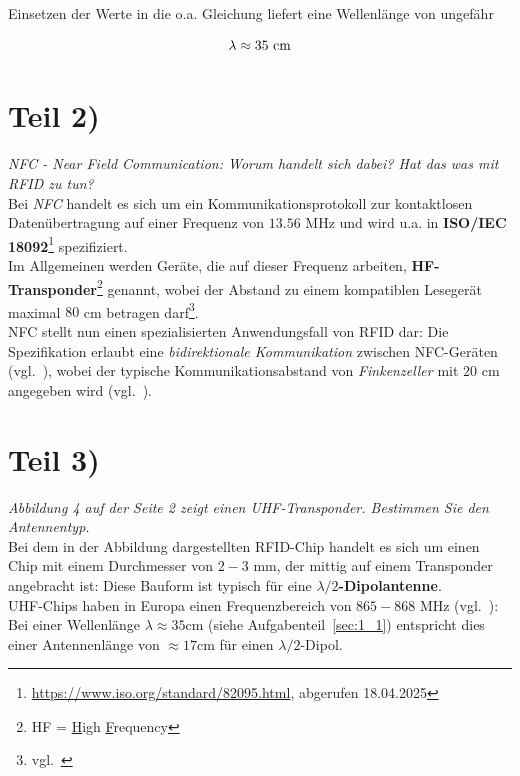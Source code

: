 \noindent
Einsetzen der Werte in die o.a. Gleichung liefert eine Wellenlänge von ungefähr

\begin{equation}\notag
\lambda \approx 35\ \text{cm}
\end{equation}


\section{Teil 2)}

\textit{NFC - Near Field Communication: Worum handelt sich dabei? Hat das was mit RFID zu tun?}\\


\noindent
Bei \textit{NFC} handelt es sich um ein Kommunikationsprotokoll zur kontaktlosen Datenübertragung auf einer Frequenz von $13.56$ MHz und wird u.a. in \textbf{ISO/IEC 18092}\footnote{
    \url{https://www.iso.org/standard/82095.html}, abgerufen 18.04.2025
} spezifiziert.\\

\noindent
Im Allgemeinen werden Geräte, die auf dieser Frequenz arbeiten, \textbf{HF-Transponder}\footnote{HF = \underline{H}igh \underline{F}requency} genannt, wobei der Abstand zu einem kompatiblen Lesegerät maximal $80$ cm betragen darf\footnote{vgl.~\cite[137]{ES5}}.\\

\noindent
NFC stellt nun einen spezialisierten Anwendungsfall von RFID dar: Die Spezifikation erlaubt eine \textit{bidirektionale Kommunikation} zwischen NFC-Geräten (vgl.~\cite[375 f.]{Fin10}), wobei der typische Kommunikationsabstand von \textit{Finkenzeller} mit $20$ cm angegeben wird (vgl.~\cite[57]{Fin10}).

\section{Teil 3)}

\textit{Abbildung 4 auf der Seite 2 zeigt einen UHF-Transponder. Bestimmen
Sie den Antennentyp.}\\

\noindent
Bei dem in der Abbildung dargestellten RFID-Chip handelt es sich um einen Chip mit einem Durchmesser von $2-3$ mm, der mittig auf einem Transponder angebracht ist: Diese Bauform ist typisch für eine \textbf{$\lambda/2$-Dipolantenne}.\\

\noindent
UHF-Chips haben in Europa einen Frequenzbereich von $865-868$ MHz (vgl.~\cite[165]{Fin10}): Bei einer Wellenlänge $\lambda \approx 35$cm (siehe Aufgabenteil~\ref{sec:1_1}) entspricht dies einer Antennenlänge von $\approx 17$cm für einen $\lambda/2$-Dipol.\\


